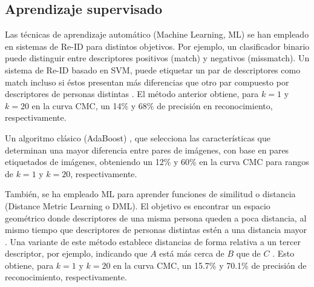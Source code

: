 \documentclass[../memoria.tex]{subfiles}
\begin{document}
\subsection{Aprendizaje supervisado}


Las técnicas de aprendizaje automático (Machine Learning, ML) se han empleado en sistemas de Re-ID para distintos objetivos. Por ejemplo, un clasificador binario puede distinguir entre descriptores positivos (match) y negativos (missmatch). Un sistema de Re-ID basado en SVM, puede etiquetar un par de descriptores como match incluso si éstos presentan más diferencias que otro par compuesto por descriptores de personas distintas \cite{prosser2010person}. El método anterior obtiene, para $k=1$ y $k=20$ en la curva CMC, un 14\% y 68\% de precisión en reconocimiento, respectivamente.


Un algoritmo clásico (AdaBoost) \cite{gray2008viewpoint},  que selecciona las características que determinan una mayor diferencia entre pares de imágenes, con base en pares etiquetados de imágenes, obteniendo un 12\% y 60\% en la curva CMC para rangos de $k=1$ y $k=20$, respectivamente. 

También, se ha empleado ML para aprender funciones de similitud o distancia (Distance Metric Learning o DML). El objetivo es encontrar un espacio geométrico donde descriptores de una misma persona queden a poca distancia, al mismo tiempo que descriptores de personas distintas estén a una distancia mayor \cite{bellet2013survey}. Una variante de este método establece distancias de forma relativa a un tercer descriptor, por ejemplo, indicando que $A$ está más cerca de $B$ que de $C$ \cite{zheng2013reidentification}. Esto obtiene, para $k=1$ y $k=20$ en la curva CMC, un 15.7\% y 70.1\% de precisión de reconocimiento, respectivamente.  
\end{document}
